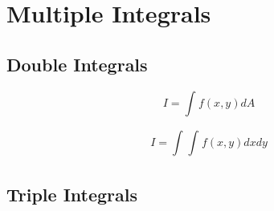 \chapter{Multiple Integrals}

\section{Double Integrals}

\begin{equation*}
    I = \int_{}^{}f(x,y)dA
\end{equation*}

\begin{equation*}
    I = \int_{}^{}\int_{}^{}f(x,y)dxdy
\end{equation*}

\section{Triple Integrals}